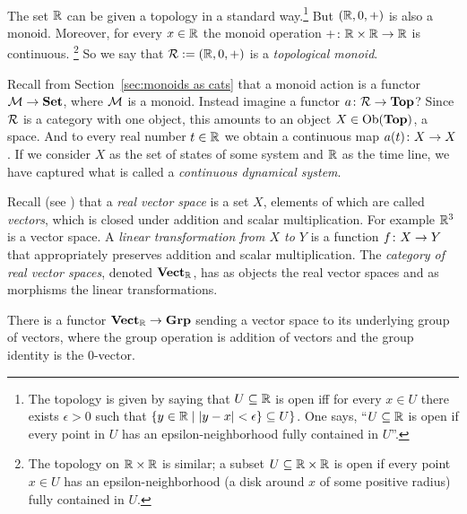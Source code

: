 \documentclass[CT4S-EN-RU]{subfiles}
\begin{document}
\begin{exerciseRUS}\label{exc:points and opens in Top}~
\end{exerciseRUS}

\begin{exampleENG}\label{ex:continuous dynamical systems}
The set ${\mathbb R}$ can be given a topology in a standard way.\footnote{The topology is given by saying that $U\subseteq{\mathbb R}$ is open iff for every $x\in U$ there exists $\epsilon>0$ such that $\{y\in {\mathbb R}{\;|\;} |y-x|<\epsilon\}\subseteq U\}$. One says, “$U\subseteq{\mathbb R}$ is open if every point in $U$ has an epsilon-neighborhood fully contained in $U$”.} But $({\mathbb R},0,+)$ is also a monoid. Moreover, for every $x\in{\mathbb R}$ the monoid operation $+\colon{\mathbb R}\times{\mathbb R}\rightarrow{\mathbb R}$ is continuous.
\footnote{The topology on ${\mathbb R}\times{\mathbb R}$ is similar; a subset $U\subseteq{\mathbb R}\times{\mathbb R}$ is open if every point $x\in U$ has an epsilon-neighborhood (a disk around $x$ of some positive radius) fully contained in $U$.}
So we say that $\mathcal{R}:=({\mathbb R},0,+)$ is a {\em topological monoid}.

Recall from Section~\ref{sec:monoids as cats} that a monoid action is a functor $\mathcal{M}\rightarrow{\mathbf{Set}}$, where $\mathcal{M}$ is a monoid. Instead imagine a functor $a\colon\mathcal{R}\rightarrow{\mathbf{Top}}$? Since $\mathcal{R}$ is a category with one object, this amounts to an object $X\in\textnormal{Ob}({\mathbf{Top}})$, a space. And to every real number $t\in{\mathbb R}$ we obtain a continuous map $a(t)\colon X\rightarrow X$. If we consider $X$ as the set of states of some system and ${\mathbb R}$ as the time line, we have captured what is called a {\em continuous dynamical system}.
\end{exampleENG}

\begin{exampleRUS}\label{ex:continuous dynamical systems}
\end{exampleRUS}

\begin{exampleENG}
Recall (see \cite{Axl}) that a {\em real vector space} is a set $X$, elements of which are called {\em vectors}, which is closed under addition and scalar multiplication. For example ${\mathbb R}^3$ is a vector space. A {\em linear transformation from $X$ to $Y$} is a function $f\colon X\rightarrow Y$ that appropriately preserves addition and scalar multiplication. The {\em category of real vector spaces}, denoted ${\mathbf{Vect}}_{\mathbb R}$, has as objects the real vector spaces and as morphisms the linear transformations.

There is a functor ${\mathbf{Vect}}_{\mathbb R}\rightarrow{\mathbf{Grp}}$ sending a vector space to its underlying group of vectors, where the group operation is addition of vectors and the group identity is the 0-vector. 
\end{exampleENG}
\end{document}
